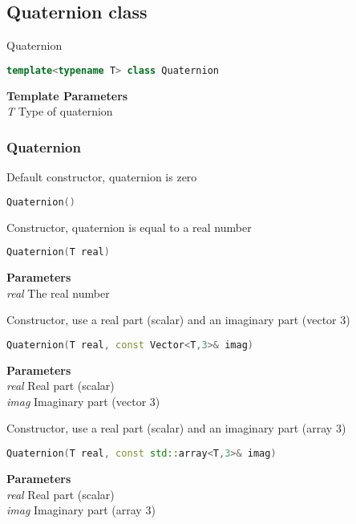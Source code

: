 \subsection{Quaternion  class}
Quaternion
\begin{lstlisting}[language=C++]
template<typename T> class Quaternion 
\end{lstlisting}
\textbf{Template Parameters} \\ 
\textit{T} Type of quaternion \\ 

\subsubsection{Quaternion}
\begin{mdframed}
Default constructor, quaternion is zero
\begin{lstlisting}[language=C++]
Quaternion()
\end{lstlisting}
\end{mdframed}

\begin{mdframed}
Constructor, quaternion is equal to a real number
\begin{lstlisting}[language=C++]
Quaternion(T real)
\end{lstlisting}
\textbf{Parameters} \\ 
\textit{real} The real number \\ 
\end{mdframed}

\begin{mdframed}
Constructor, use a real part (scalar) and an imaginary part (vector 3)
\begin{lstlisting}[language=C++]
Quaternion(T real, const Vector<T,3>& imag)
\end{lstlisting}
\textbf{Parameters} \\ 
\textit{real} Real part (scalar) \\ 
\textit{imag} Imaginary part (vector 3) \\ 
\end{mdframed}

\begin{mdframed}
Constructor, use a real part (scalar) and an imaginary part (array 3)
\begin{lstlisting}[language=C++]
Quaternion(T real, const std::array<T,3>& imag)
\end{lstlisting}
\textbf{Parameters} \\ 
\textit{real} Real part (scalar) \\ 
\textit{imag} Imaginary part (array 3) \\ 
\end{mdframed}

